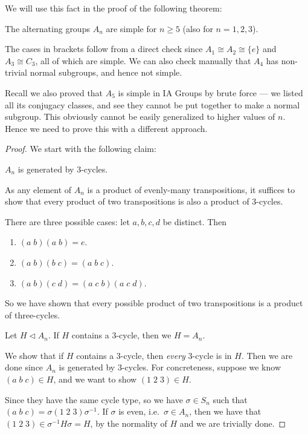 \documentclass[a4paper]{article}
\begin{document}
We will use this fact in the proof of the following theorem:
\begin{thm}
  The alternating groups $A_n$ are simple for $n \geq 5$ (also for $n = 1, 2, 3$).
\end{thm}
The cases in brackets follow from a direct check since $A_1 \cong A_2 \cong \{e\}$ and $A_3 \cong C_3$, all of which are simple. We can also check manually that $A_4$ has non-trivial normal subgroups, and hence not simple.

Recall we also proved that $A_5$ is simple in IA Groups by brute force --- we listed all its conjugacy classes, and see they cannot be put together to make a normal subgroup. This obviously cannot be easily generalized to higher values of $n$. Hence we need to prove this with a different approach.

\begin{proof}
  We start with the following claim:
  \begin{claim}
    $A_n$ is generated by $3$-cycles.
  \end{claim}
  As any element of $A_n$ is a product of evenly-many transpositions, it suffices to show that every product of two transpositions is also a product of $3$-cycles.

  There are three possible cases: let $a, b, c, d$ be distinct. Then
  \begin{enumerate}
    \item $(a\; b)(a\; b) = e$.
    \item $(a\; b)(b\; c) = (a\; b\; c)$.
    \item $(a\; b)(c\; d) = (a\; c\; b)(a\; c\; d)$.
  \end{enumerate}
  So we have shown that every possible product of two transpositions is a product of three-cycles.

  \begin{claim}
    Let $H \lhd A_n$. If $H$ contains a $3$-cycle, then we $H = A_n$.
  \end{claim}
  We show that if $H$ contains a $3$-cycle, then \emph{every} $3$-cycle is in $H$. Then we are done since $A_n$ is generated by $3$-cycles. For concreteness, suppose we know $(a\; b\; c) \in H$, and we want to show $(1\; 2\; 3) \in H$.

  Since they have the same cycle type, so we have $\sigma \in S_n$ such that $(a\; b\; c) = \sigma(1\; 2\; 3) \sigma^{-1}$. If $\sigma$ is even, i.e.\ $\sigma \in A_n$, then we have that $(1\; 2\; 3) \in \sigma^{-1}H\sigma = H$, by the normality of $H$ and we are trivially done.


\end{proof}
\end{document}
